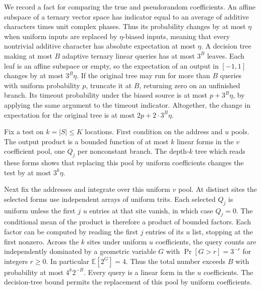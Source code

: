 \documentclass[11pt]{article}
\begin{document}
We record a fact for comparing the true and pseudorandom coefficients.
An affine subspace of a ternary vector space has indicator equal to an
average of additive characters times unit complex phases. Thus its
probability changes by at most $\eta$ when uniform inputs are replaced
by $\eta$-biased inputs, meaning that every nontrivial additive
character has absolute expectation at most $\eta$. A decision tree
making at most $B$ adaptive ternary linear queries has at most $3^B$
leaves. Each leaf is an affine subspace or empty, so the expectation of
an output in $[-1,1]$ changes by at most $3^B\eta$. If the original
tree may run for more than $B$ queries with uniform probability $p$,
truncate it at $B$, returning zero on an unfinished branch. Its timeout
probability under the biased source is at most $p+3^B\eta$, by applying
the same argument to the timeout indicator. Altogether, the change in
expectation for the original tree is at most $2p+2\cdot3^B\eta$.

Fix a test on $k=|S|\le K$ locations. First condition on the address
and $u$ pools. The output product is a bounded function of at most $k$
linear forms in the $v$ coefficient pool, one $Q_j$ per nonconstant
branch. The depth-$k$ tree which reads these forms shows that replacing
this pool by uniform coefficients changes the test by at most $3^k\eta$.

Next fix the addresses and integrate over this uniform $v$ pool.
At distinct sites the selected forms use independent arrays of
uniform trits. Each selected $Q_j$ is uniform unless the first $j$
$u$ entries at that site vanish, in which case $Q_j=0$. The conditional
mean of the product is therefore a product of bounded factors. Each
factor can be computed by reading the first $j$ entries of its $u$
list, stopping at the first nonzero. Across the $k$ sites under uniform
$u$ coefficients, the query counts are independently dominated by a
geometric variable $G$ with $\Pr[G>r]=3^{-r}$ for integers $r\ge0$.
In particular $\mathbb E[2^G]=4$. Thus the total number exceeds $B$
with probability at most $4^k2^{-B}$. Every query is a linear form in
the $u$ coefficients. The decision-tree bound permits the replacement
of this pool by uniform coefficients.
\end{document}
